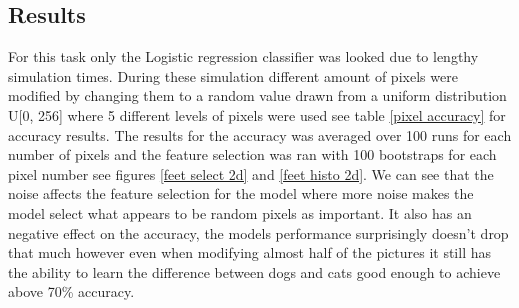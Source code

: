 \documentclass{article}
\begin{document}
\subsection{Results}
For this task only the Logistic regression classifier was looked due to lengthy simulation times. During these simulation different amount of pixels were modified by changing them to a random value drawn from a uniform distribution U[0, 256] where 5 different levels of pixels were used see table \ref{pixel accuracy} for accuracy results. The results for the accuracy was averaged over 100 runs for each number of pixels and the feature selection was ran with 100 bootstraps for each pixel number see figures \ref{feet select 2d} and \ref{feet histo 2d}. We can see that the noise affects the feature selection for the model where more noise makes the model select what appears to be random pixels as important. It also has an negative effect on the accuracy, the models performance surprisingly doesn't drop that much however even when modifying almost half of the pictures it still has the ability to learn the difference between dogs and cats good enough to achieve above 70\% accuracy.
\end{document}
